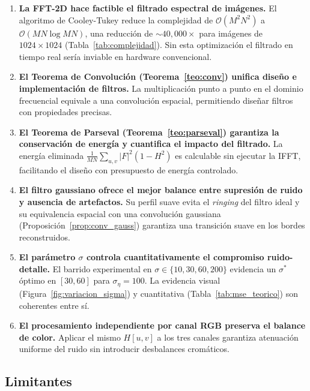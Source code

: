 \documentclass[conference]{IEEEtran}
\begin{document}
\begin{enumerate}

\item \textbf{La FFT-2D hace factible el filtrado espectral de imágenes.}
El algoritmo de Cooley-Tukey reduce la complejidad de $\mathcal{O}(M^2N^2)$
a $\mathcal{O}(MN\log MN)$, una reducción de $\sim 40{,}000\times$ para
imágenes de $1024\times1024$ (Tabla~\ref{tab:complejidad}). Sin esta
optimización el filtrado en tiempo real sería inviable en hardware convencional.

\item \textbf{El Teorema de Convolución (Teorema~\ref{teo:conv}) unifica
diseño e implementación de filtros.}
La multiplicación punto a punto en el dominio frecuencial equivale a una
convolución espacial, permitiendo diseñar filtros con propiedades precisas.

\item \textbf{El Teorema de Parseval (Teorema~\ref{teo:parseval}) garantiza
la conservación de energía y cuantifica el impacto del filtrado.}
La energía eliminada $\frac{1}{MN}\sum_{u,v}|F|^2(1-H^2)$ es calculable
sin ejecutar la IFFT, facilitando el diseño con presupuesto de energía controlado.

\item \textbf{El filtro gaussiano ofrece el mejor balance entre supresión
de ruido y ausencia de artefactos.}
Su perfil suave evita el \textit{ringing} del filtro ideal y su equivalencia
espacial con una convolución gaussiana (Proposición~\ref{prop:conv_gauss})
garantiza una transición suave en los bordes reconstruidos.

\item \textbf{El parámetro $\sigma$ controla cuantitativamente el compromiso
ruido-detalle.}
El barrido experimental en $\sigma\in\{10, 30, 60, 200\}$ evidencia un
$\sigma^*$ óptimo en $[30,60]$ para $\sigma_\eta=100$. La evidencia visual
(Figura~\ref{fig:variacion_sigma}) y cuantitativa (Tabla~\ref{tab:mse_teorico})
son coherentes entre sí.

\item \textbf{El procesamiento independiente por canal RGB preserva el
balance de color.}
Aplicar el mismo $H[u,v]$ a los tres canales garantiza atenuación uniforme
del ruido sin introducir desbalances cromáticos.


\end{enumerate}

\subsection{Limitantes}
\end{document}
